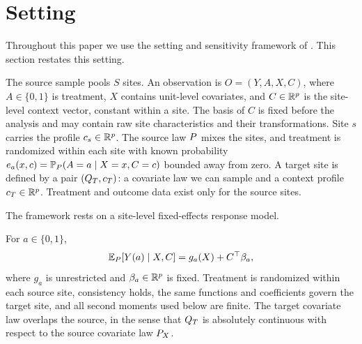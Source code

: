 \section{Setting}
\label{sec:setting}

Throughout this paper we use the setting and sensitivity framework of \citet{boyarsky2026}. This section restates this setting.

The source sample pools $S$ sites. An observation is $O=(Y,A,X,C)$, where
$A\in\{0,1\}$ is treatment, $X$ contains unit-level covariates, and
$C\in\mathbb{R}^p$ is the site-level context vector, constant within a site. The
basis of $C$ is fixed before the analysis and may contain raw site
characteristics and their transformations. Site $s$ carries the profile
$c_s\in\mathbb{R}^p$. The source law $P$ mixes the sites, and treatment is
randomized within each site with known probability
$e_a(x,c)=\mathbb{P}_P(A=a\mid X=x,C=c)$ bounded away from zero. A target site is defined by a
pair $(Q_T,c_T)$: a covariate law we can sample and a context profile
$c_T\in\mathbb{R}^p$. Treatment and outcome data exist only for the source sites.

The framework rests on a site-level fixed-effects response model.

\begin{assumption}
\label{ass:model}
For $a\in\{0,1\}$,
\begin{equation}
  \mathbb{E}_P[Y(a)\mid X,C]=g_a(X)+C^\top\beta_a,
  \label{eq:response-model}
\end{equation}
where $g_a$ is unrestricted and $\beta_a\in\mathbb{R}^p$ is fixed. Treatment is
randomized within each source site, consistency holds, the same
functions and coefficients govern the target site, and all second
moments used below are finite. The target covariate law overlaps the
source, in the sense that $Q_T$ is absolutely continuous with respect to
the source covariate law $P_X$.
\end{assumption}

